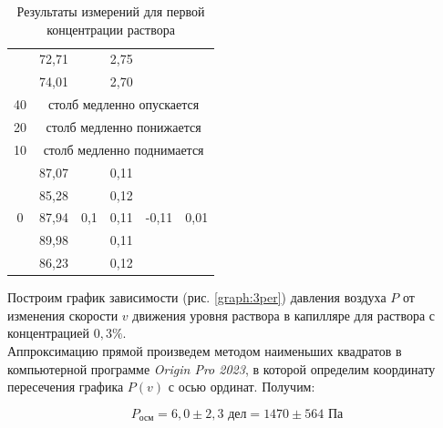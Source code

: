 \documentclass[a4paper, 12pt]{article}
\begin{document}
\begin{table}[H]
\begin{tabular}{|c|ccccc|}
             & \multicolumn{1}{c|}{72,71} & \multicolumn{1}{c|}{} & \multicolumn{1}{c|}{2,75} & \multicolumn{1}{c|}{} &  \\ \cline{2-2} \cline{4-4}
             & \multicolumn{1}{c|}{74,01} & \multicolumn{1}{c|}{} & \multicolumn{1}{c|}{2,70} & \multicolumn{1}{c|}{} &  \\ \hline
            40 & \multicolumn{5}{c|}{столб медленно опускается} \\ \hline
            20 & \multicolumn{5}{c|}{столб медленно понижается} \\ \hline
            10 & \multicolumn{5}{c|}{столб медленно поднимается} \\ \hline
            \multirow{5}{*}{0} & \multicolumn{1}{c|}{87,07} & \multicolumn{1}{c|}{\multirow{5}{*}{0,1}} & \multicolumn{1}{c|}{0,11} & \multicolumn{1}{c|}{\multirow{5}{*}{-0,11}} & \multirow{5}{*}{0,01} \\ \cline{2-2} \cline{4-4}
             & \multicolumn{1}{c|}{85,28} & \multicolumn{1}{c|}{} & \multicolumn{1}{c|}{0,12} & \multicolumn{1}{c|}{} &  \\ \cline{2-2} \cline{4-4}
             & \multicolumn{1}{c|}{87,94} & \multicolumn{1}{c|}{} & \multicolumn{1}{c|}{0,11} & \multicolumn{1}{c|}{} &  \\ \cline{2-2} \cline{4-4}
             & \multicolumn{1}{c|}{89,98} & \multicolumn{1}{c|}{} & \multicolumn{1}{c|}{0,11} & \multicolumn{1}{c|}{} &  \\ \cline{2-2} \cline{4-4}
             & \multicolumn{1}{c|}{86,23} & \multicolumn{1}{c|}{} & \multicolumn{1}{c|}{0,12} & \multicolumn{1}{c|}{} &  \\ \hline
            \end{tabular}
            \caption{Результаты измерений для первой концентрации раствора}
            \label{table:3per}
        \end{table}

        \noindent Построим график зависимости (рис. \ref{graph:3per}) давления воздуха $P$ от изменения скорости $v$ движения уровня раствора в капилляре для раствора с концентрацией $0,3 \%$. \\

        \noindent Аппроксимацию прямой произведем методом наименьших квадратов в компьютерной программе \textit{Origin Pro 2023}, в которой определим координату пересечения графика $P(v)$ с осью ординат. Получим:

        $$
        \boxed{P_\text{осм} = 6,0 \pm 2,3 \text{ дел} = 1470 \pm 564 \text{ Па}}
        $$
\end{document}
